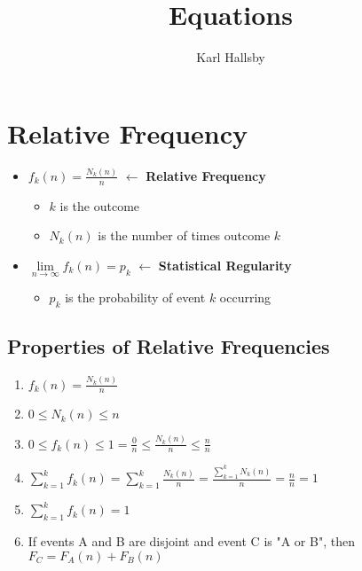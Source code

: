\documentclass[10pt,letterpaper,final,twoside,notitlepage]{article}
\author{Karl Hallsby}
\title{Equations}
\begin{document}
\section{Relative Frequency} \label{sec:Relative Frequency}
\begin{itemize}
	\item $f_k (n) = \frac{N_k (n)}{n}$ $\leftarrow$ {\large \textbf{Relative Frequency}}
	\begin{itemize}
		\item $k$ is the outcome
		\item $N_k (n)$ is the number of times outcome $k$
	\end{itemize}
	\item $\lim\limits_{n \rightarrow \infty} f_k (n) = p_k$ $\leftarrow$ {\large \textbf{Statistical Regularity}}
	\begin{itemize}
		\item $p_k$ is the probability of event $k$ occurring
	\end{itemize}
\end{itemize}

	\subsection{Properties of Relative Frequencies} \label {subsec:Properties Relative Frequency}
	\begin{enumerate}
		\item $f_k (n) = \frac{N_k (n)}{n}$
		\item $0 \leq N_k (n) \leq n$
		\item $0 \leq f_k (n) \leq 1 = \frac{0}{n} \leq \frac{N_k (n)}{n} \leq \frac{n}{n}$
		\item $\sum_{k=1}^{k} f_k (n) = \sum_{k=1}^{k} \frac{N_k (n)}{n} = \frac{\sum_{k=1}^{k} N_k (n)}{n} = \frac{n}{n} = 1$
		\item $\sum_{k=1}^{k} f_k (n) = 1$
		\item If events A and B are disjoint and event C is "A or B", then $F_C = F_A (n) + F_B (n)$
	\end{enumerate}
\end{document}
